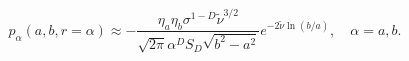 \begin{equation}\label{palphsigll1}
  p_{\alpha }(a,b,r=\alpha )\approx -\frac{\eta _{a}\eta _{b}\sigma ^{1-D}
  \tilde \nu ^{3/2}}{\sqrt{2\pi }\alpha ^{D}S_{D}\sqrt{b^{2}-a^{2}}}e^{-2
  \tilde \nu \ln (b/a)},\quad \alpha =a,b.
\end{equation}

